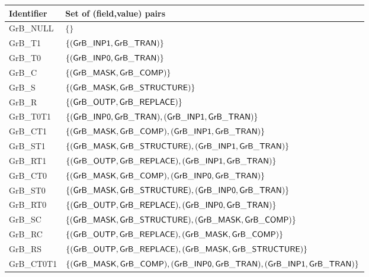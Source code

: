 \begin{table}[htbp]
\begin{center}
	\begin{small}
	    \begin{tabular}{l|l} 
		Identifier		& Set of (field,value) pairs \\ \hline
		{\sf GrB\_NULL}		& $\{                                                                         \}$	\\
		{\sf GrB\_T1}		& $\{ ({\sf GrB\_INP1},{\sf GrB\_TRAN})                                                   \}$ 	\\
		{\sf GrB\_T0}		& $\{ ({\sf GrB\_INP0},{\sf GrB\_TRAN})                                                   \}$ 	\\
		{\sf GrB\_C}		& $\{ ({\sf GrB\_MASK},{\sf GrB\_COMP})                                                     \}$	\\
		{\sf GrB\_S}		& $\{ ({\sf GrB\_MASK},{\sf GrB\_STRUCTURE})                                                \}$	\\
		{\sf GrB\_R}		& $\{ ({\sf GrB\_OUTP},{\sf GrB\_REPLACE})                                                  \}$	\\
		{\sf GrB\_T0T1}		& $\{ ({\sf GrB\_INP0},{\sf GrB\_TRAN})   , ({\sf GrB\_INP1},{\sf GrB\_TRAN})                         \}$	\\
		{\sf GrB\_CT1}		& $\{ ({\sf GrB\_MASK},{\sf GrB\_COMP})     , ({\sf GrB\_INP1},{\sf GrB\_TRAN})                         \}$	\\
		{\sf GrB\_ST1}		& $\{ ({\sf GrB\_MASK},{\sf GrB\_STRUCTURE}), ({\sf GrB\_INP1},{\sf GrB\_TRAN})                         \}$	\\
		{\sf GrB\_RT1}		& $\{ ({\sf GrB\_OUTP},{\sf GrB\_REPLACE})  , ({\sf GrB\_INP1},{\sf GrB\_TRAN})                         \}$	\\
		{\sf GrB\_CT0}		& $\{ ({\sf GrB\_MASK},{\sf GrB\_COMP})     , ({\sf GrB\_INP0},{\sf GrB\_TRAN})                         \}$	\\
		{\sf GrB\_ST0}		& $\{ ({\sf GrB\_MASK},{\sf GrB\_STRUCTURE}), ({\sf GrB\_INP0},{\sf GrB\_TRAN})                         \}$	\\
		{\sf GrB\_RT0}		& $\{ ({\sf GrB\_OUTP},{\sf GrB\_REPLACE})  , ({\sf GrB\_INP0},{\sf GrB\_TRAN})                         \}$	\\
		{\sf GrB\_SC}		& $\{ ({\sf GrB\_MASK},{\sf GrB\_STRUCTURE}), ({\sf GrB\_MASK},{\sf GrB\_COMP})                           \}$	\\
		{\sf GrB\_RC}		& $\{ ({\sf GrB\_OUTP},{\sf GrB\_REPLACE})  , ({\sf GrB\_MASK},{\sf GrB\_COMP})                           \}$	\\
		{\sf GrB\_RS}		& $\{ ({\sf GrB\_OUTP},{\sf GrB\_REPLACE})  , ({\sf GrB\_MASK},{\sf GrB\_STRUCTURE})                      \}$	\\
		{\sf GrB\_CT0T1}	& $\{ ({\sf GrB\_MASK},{\sf GrB\_COMP})     ,({\sf GrB\_INP0},{\sf GrB\_TRAN}),({\sf GrB\_INP1},{\sf GrB\_TRAN})    \}$	\\

\end{tabular}
\end{small}
\end{center}
\end{table}
